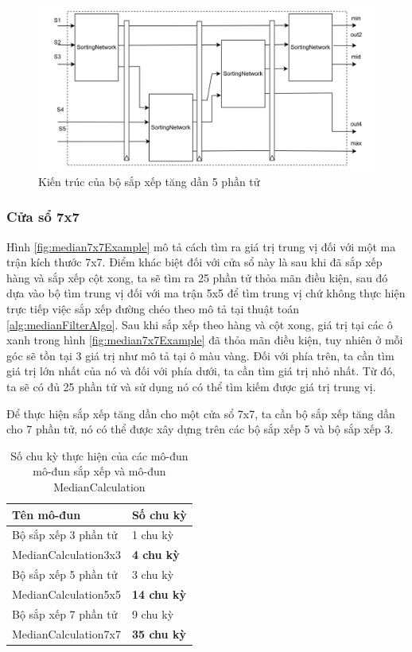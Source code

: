 \begin{figure}[!ht]
	\centering
	\includegraphics[width=\linewidth]{figures/sortAscending5x5RTL.png}
	\caption{Kiến trúc của bộ sắp xếp tăng dần 5 phần tử}
	\label{fig:sortAscending5x5RTL}
\end{figure}

\subsubsection{Cửa sổ 7x7}

Hình \ref{fig:median7x7Example} mô tả cách tìm ra giá trị trung vị đối với một ma trận kích thước 7x7. Điểm khác biệt đối với cửa sổ này là sau khi đã sắp xếp hàng và sắp xếp cột xong, ta sẽ tìm ra 25 phần tử thỏa mãn điều kiện, sau đó dựa vào bộ tìm trung vị đối với ma trận 5x5 để tìm trung vị chứ không thực hiện trực tiếp việc sắp xếp đường chéo theo mô tả tại thuật toán \ref{alg:medianFilterAlgo}. Sau khi sắp xếp theo hàng và cột xong, giá trị tại các ô xanh trong hình \ref{fig:median7x7Example} đã thỏa mãn điều kiện, tuy nhiên ở mỗi góc sẽ tồn tại 3 giá trị như mô tả tại ô màu vàng. Đối với phía trên, ta cần tìm giá trị lớn nhất của nó và đối với phía dưới, ta cần tìm giá trị nhỏ nhất. Từ đó, ta sẽ có đủ 25 phần tử và sử dụng nó có thể tìm kiếm được giá trị trung vị.

Để thực hiện sắp xếp tăng dần cho một cửa sổ 7x7, ta cần bộ sắp xếp tăng dần cho 7 phần tử, nó có thể được xây dựng trên các bộ sắp xếp 5 và bộ sắp xếp 3.


\begin{table}[H]
	\centering
	\renewcommand{\arraystretch}{1.3}
		\caption{Số chu kỳ thực hiện của các mô-đun mô-đun sắp xếp và mô-đun MedianCalculation}
	\begin{tabular}{|p{5cm} p{5cm} |}
		\hline
		\rowcolor{gray!30}
		\textbf{Tên mô-đun} & \textbf{Số chu kỳ}
		\\ \hline
		Bộ sắp xếp 3 phần tử & 1 chu kỳ
		  \\
		\hline
		MedianCalculation3x3  & \textbf{4 chu kỳ}
		\\ \hline
		Bộ sắp xếp 5 phần tử & 3 chu kỳ
		\\ \hline
		MedianCalculation5x5 & \textbf{14 chu kỳ}
			\\ \hline
		Bộ sắp xếp 7 phần tử & 9 chu kỳ
		\\ \hline
		MedianCalculation7x7 & \textbf{35 chu kỳ}
		\\ \hline
	\end{tabular}

	\label{tab:numberOfCycleMedianCalculation}
\end{table}

